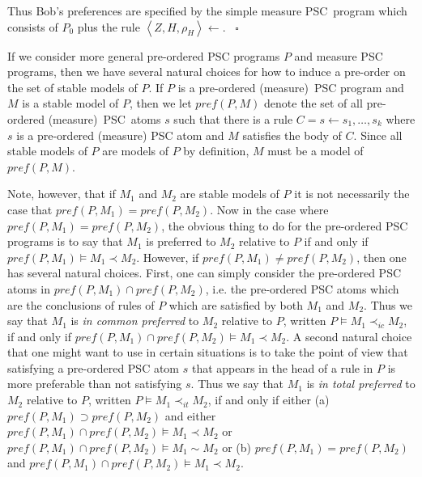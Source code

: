 \documentclass[letterpaper]{article}\usepackage{aaai}
\begin{document}
Thus Bob's preferences are specified by the simple measure PSC\ program which
consists of $P_{0}$ plus the rule $\left\langle Z,H,\rho_{H}\right\rangle
\leftarrow.$ \ $\square$

If we consider more general pre-ordered PSC programs $P$ and measure PSC
programs, then we have several natural choices for how to induce a pre-order
on the set of stable models of $P$. If $P$ is a pre-ordered (measure)\ PSC
program and $M$ is a stable model of $P$, then we let $pref\left(  P,M\right)
$ denote the set of all pre-ordered (measure)\ PSC\ atoms $s$ such that there
is a rule $C=s\leftarrow s_{1},\ldots,s_{k}$ where $s$ is a pre-ordered
(measure) PSC atom and $M$ satisfies the body of $C$. Since all stable models
of $P$ are models of $P$ by definition, $M$ must be a model of $pref(P,M)$.

Note, however, that if $M_{1}$ and $M_{2}$ are stable models of $P$ it is not
necessarily the case that $pref(P,M_{1})=pref(P,M_{2})$. Now in the case where
$pref(P,M_{1})=pref(P,M_{2})$, the obvious thing to do for the pre-ordered PSC
programs is to say that $M_{1}$ is preferred to $M_{2}$ relative to $P$ if and
only if $pref(P,M_{1})\models M_{1}\prec M_{2}$. However, if $pref(P,M_{1})\neq pref(P,M_{2})$, then one has several natural choices. First, one can
simply consider the pre-ordered PSC atoms in $pref(P,M_{1})\cap pref(P,M_{2})$, i.e. the pre-ordered PSC atoms which are the conclusions of rules of $P$
which are satisfied by both $M_{1}$ and $M_{2}$. Thus we say that $M_{1}$ is
\emph{in common preferred} to $M_{2}$ relative to $P$, written $P\models
M_{1}\prec_{ic}M_{2}$, if and only if $pref(P,M_{1})\cap pref(P,M_{2})\models
M_{1}\prec M_{2}$. A second natural choice that one might want to use in
certain situations is to take the point of view that satisfying a pre-ordered
PSC atom $s$ that appears in the head of a rule in $P$ is more preferable than
not satisfying $s$. Thus we say that $M_{1}$ is \emph{in total preferred} to
$M_{2}$ relative to $P$, written $P\models M_{1}\prec_{it}M_{2}$, if and only
if either (a) $pref(P,M_{1})\supset pref(P,M_{2})$ and either $pref(P,M_{1})\cap pref(P,M_{2})\models M_{1}\prec M_{2}$ or $pref(P,M_{1})\cap
pref(P,M_{2})\models M_{1}\sim M_{2}$ or (b) $pref(P,M_{1})=pref(P,M_{2})$ and
$pref(P,M_{1})\cap pref(P,M_{2})\models M_{1}\prec M_{2}$.
\end{document}
